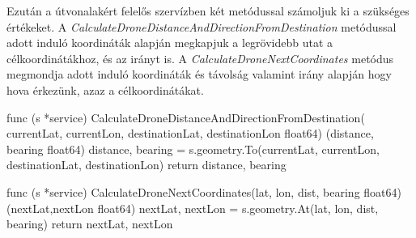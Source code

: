 Ezután a útvonalakért felelős szervízben két metódussal számoljuk ki a szükséges értékeket.
A \textit{CalculateDroneDistanceAndDirectionFromDestination} metódussal adott induló koordináták alapján megkapjuk a legrövidebb utat a célkoordinátákhoz, és az irányt is.
A \textit{CalculateDroneNextCoordinates} metódus megmondja adott induló koordináták és távolság valamint irány alapján hogy hova érkezünk, azaz a célkoordinátákat.

\begin{python}
    func (s *service) CalculateDroneDistanceAndDirectionFromDestination(
    currentLat, currentLon, destinationLat, destinationLon float64)
    (distance, bearing float64) {
        distance, bearing = s.geometry.To(currentLat,
        currentLon, destinationLat, destinationLon)
        return distance, bearing
    }

    func (s *service) CalculateDroneNextCoordinates(lat, lon,
    dist, bearing float64) (nextLat,nextLon float64) {
        nextLat, nextLon = s.geometry.At(lat, lon, dist, bearing)
        return nextLat, nextLon
    }
\end{python}


